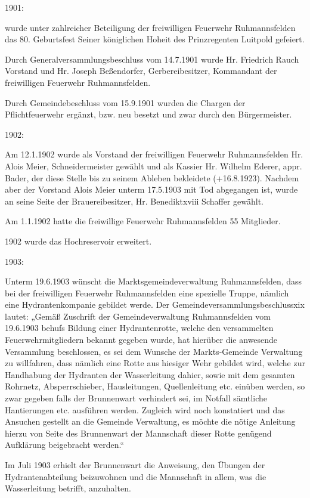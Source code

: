 \documentclass[12pt,a4pager]{book}
\begin{document}
1901:

wurde unter zahlreicher Beteiligung der freiwilligen Feuerwehr Ruhmannsfelden
das 80. Geburtsfest Seiner königlichen Hoheit des Prinzregenten Luitpold
gefeiert.

Durch Generalversammlungsbeschluss vom 14.7.1901 wurde Hr. Friedrich Rauch
Vorstand und Hr. Joseph Beßendorfer, Gerbereibesitzer, Kommandant der
freiwilligen Feuerwehr Ruhmannsfelden.

Durch Gemeindebeschluss vom 15.9.1901 wurden die Chargen der Pflichtfeuerwehr
ergänzt, bzw. neu besetzt und zwar durch den Bürgermeister.

1902:

Am 12.1.1902 wurde als Vorstand der freiwilligen Feuerwehr Ruhmannsfelden Hr.
Alois Meier, Schneidermeister gewählt und als Kassier Hr. Wilhelm Ederer, appr.
Bader, der diese Stelle bis zu seinem Ableben bekleidete (+16.8.1923). Nachdem
aber der Vorstand Alois Meier unterm 17.5.1903 mit Tod abgegangen ist, wurde an
seine Seite der Brauereibesitzer, Hr. Benediktxviii Schaffer gewählt.

Am 1.1.1902 hatte die freiwillige Feuerwehr Ruhmannsfelden 55 Mitglieder.

1902 wurde das Hochreservoir erweitert.

1903:

Unterm 19.6.1903 wünscht die Marktsgemeindeverwaltung Ruhmannsfelden, dass bei
der freiwilligen Feuerwehr Ruhmannsfelden eine spezielle Truppe, nämlich eine
Hydrantenkompanie gebildet werde. Der Gemeindeversammlungsbeschlussxix lautet:
„Gemäß Zuschrift der Gemeindeverwaltung Ruhmannsfelden vom 19.6.1903 behufs
Bildung einer Hydrantenrotte, welche den versammelten Feuerwehrmitgliedern
bekannt gegeben wurde, hat hierüber die anwesende Versammlung beschlossen, es
sei dem Wunsche der Markts-Gemeinde Verwaltung zu willfahren, dass nämlich eine
Rotte aus hiesiger Wehr gebildet wird, welche zur Handhabung der Hydranten der
Wasserleitung dahier, sowie mit dem gesamten Rohrnetz, Absperrschieber,
Hausleitungen, Quellenleitung etc. einüben werden, so zwar gegeben falls der
Brunnenwart verhindert sei, im Notfall sämtliche Hantierungen etc. ausführen
werden. Zugleich wird noch konstatiert und das Ansuchen gestellt an die Gemeinde
Verwaltung, es möchte die nötige Anleitung hierzu von Seite des Brunnenwart der
Mannschaft dieser Rotte genügend Aufklärung beigebracht werden.“

Im Juli 1903 erhielt der Brunnenwart die Anweisung, den Übungen der
Hydrantenabteilung beizuwohnen und die Mannschaft in allem, was die
Wasserleitung betrifft, anzuhalten.
\end{document}
